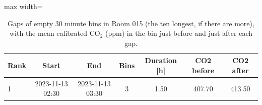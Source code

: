 \begin{table}[ht]
\centering
\begin{adjustbox}{max width=\textwidth}
\begin{tabular}{lcccccc}
\hline
Rank & Start & End & Bins & Duration [h] & CO2 before & CO2 after \\
\hline
1 & 2023-11-13 02:30 & 2023-11-13 03:30 & 3 & 1.50 & 407.70 & 413.50 \\
\hline
\end{tabular}
\end{adjustbox}
\caption{Gaps of empty 30 minute bins in Room 015 (the ten longest, if there are more), with the mean calibrated CO$_2$ (ppm) in the bin just before and just after each gap.}
\label{tab:room_015_gaps}
\end{table}
